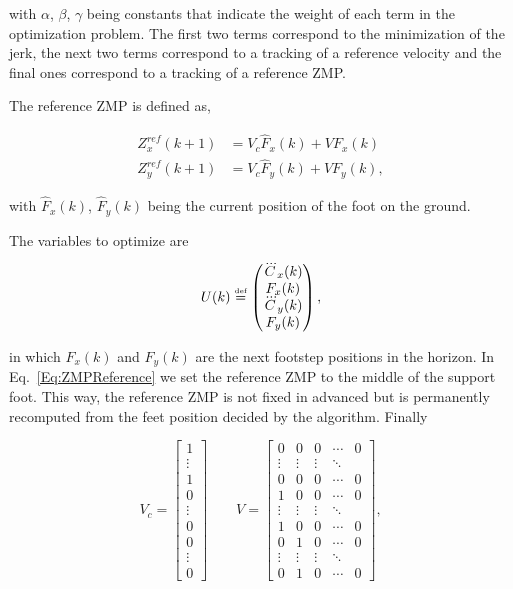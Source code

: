 \noindent with $\alpha$, $\beta$, $\gamma$ being constants that indicate the weight of each term in the optimization problem. The first two terms correspond to the minimization of the jerk, the next two terms correspond to a tracking of a reference velocity and the final ones correspond to a tracking of a reference ZMP.

The reference ZMP is defined as,

\begin{eqnarray}
\label{Eq:ZMPReference}
  Z_x^{ref}(k+1) & = V_c \hat{F}_x(k) + V F_x(k) \nonumber \\
  Z_y^{ref}(k+1) & = V_c \hat{F}_y(k) + V F_y(k),
\end{eqnarray}

\noindent with $\hat{F}_x(k)$, $\hat{F}_y(k)$ being the current position of the foot on
the ground.

The variables to optimize are

$$
U(k) \stackrel{\mbox{\tiny def}}{=} 
\left(
\begin{matrix}
\dddot{C}_{x}(k) \\
F_x(k) \\
\dddot{C}_{y}(k) \\
F_y(k)
\end{matrix}
\right),
$$

\noindent in which $F_x(k)$ and $F_y(k)$ are the next footstep positions in the horizon. In Eq.~\ref{Eq:ZMPReference} we set the reference ZMP to the middle of the support foot. This way, the reference ZMP is not fixed in advanced but is permanently recomputed from the feet position decided by the algorithm. Finally

\begin{equation*}
   V_c = \begin{bmatrix}1 \\ \vdots \\ 1 \\ 0 \\ \vdots \\ 0 \\ 0 \\ \vdots \\ 0  \end{bmatrix} \qquad
   V = \begin{bmatrix} 0 & 0 & 0 & \cdots & 0 \\ \vdots & \vdots
     & \vdots & \ddots\\ 
                                           0 & 0 & 0 & \cdots & 0\\
                           1 & 0 & 0 & \cdots & 0 \\ \vdots & \vdots &
                           \vdots &
                           \ddots \\ 1 & 0 & 0 &\cdots &0\\
                           0 & 1 & 0 & \cdots & 0\\ \vdots & \vdots &
                           \vdots & \ddots \\ 0 & 1 & 0 & \cdots &0\end{bmatrix},
\end{equation*}

